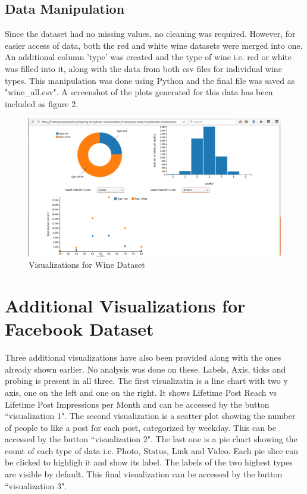 \documentclass{article}
\begin{document}
\subsection*{Data Manipulation}
Since the dataset had no missing values, no cleaning was required. However, for easier access of data, both the red and white wine datasets were merged into one. An additional column 'type' was created and the type of wine i.e. red or white was filled into it, along with the data from both csv files for individual wine types. This manipulation was done using Python and the final file was saved as "wine\_all.csv". A screenshot of the plots generated for this data has been included as figure 2.

\begin{figure}[h]
\centering
\includegraphics[scale=0.3]{wine_all.png}
\caption{Visualizations for Wine Dataset}
\end{figure}

\section*{Additional Visualizations for Facebook Dataset}

Three additional visualizations have also been provided along with the ones already shown earlier. No analysis was done on these. Labels, Axis, ticks and probing is present in all three. The first visualizatin is a line chart with two y axis, one on the left and one on the right. It shows Lifetime Post Reach vs Lifetime Post Impressions per Month and can be accessed by the button ``visualization 1". The second visualization is a scatter plot showing the number of people to like a post for each post, categorized by weekday. This can be accessed by the button ``visualization 2". The last one is a pie chart showing the count of each type of data i.e. Photo, Status, Link and Video. Each pie slice can be clicked to highligh it and show its label. The labels of the two highest types are visible by default. This final visualization can be accessed by the button ``visualization 3". 
\end{document}
